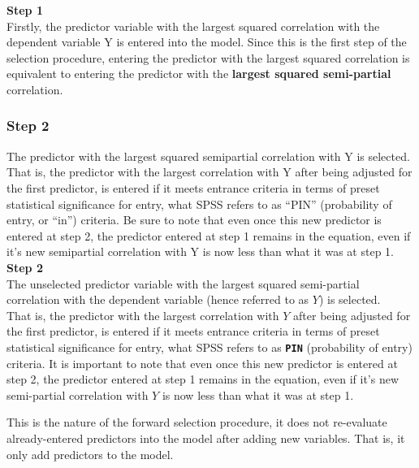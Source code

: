 \textbf{Step 1}\\
Firstly, the predictor variable with the largest squared correlation with the dependent variable Y is entered into the model. Since this is the first step of the selection procedure, entering the predictor with the largest squared correlation is equivalent to entering the predictor with the \textbf{largest squared semi-partial} correlation. 





\subsubsection*{Step 2}
The predictor with the largest squared semipartial correlation with Y is selected. That is, the predictor with the largest correlation with Y after being adjusted for the first predictor, is entered if it meets entrance criteria in terms of preset statistical significance for entry, what SPSS refers to as “PIN” (probability of entry, or “in”) criteria. Be sure to note that even once this new predictor is entered at step 2, the predictor entered at step 1 remains in the equation, even if it’s new semipartial correlation with Y is now less than what it was at step 1. 
\\
\textbf{Step 2}\\
The unselected predictor variable with the largest squared semi-partial correlation with the dependent variable (hence referred to as $Y$) is selected. 
\\
That is, the predictor with the largest correlation with $Y$ after being adjusted for the first predictor, is entered if it meets entrance criteria in terms of preset statistical significance for entry, what SPSS refers to as
\textbf{\texttt{PIN}} (probability of entry) criteria. 
It is important to note that even once this new predictor is entered at step 2, the predictor entered at step 1 remains in the equation, even if it's new semi-partial correlation with $Y$ is now less than what it was at step 1. 

This is the nature of the forward selection procedure, it does not re-evaluate already-entered predictors into the model after adding new variables. That is, it only add predictors to the model. 


